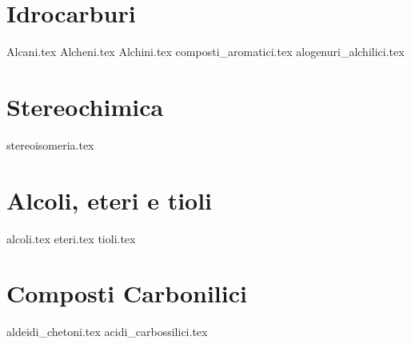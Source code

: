 \documentclass[a4paper,12pt,oneside]{book} %
\begin{document}
\part{Idrocarburi}
{Alcani.tex} %
{Alcheni.tex} %
{Alchini.tex} %
{composti_aromatici.tex} %
{alogenuri_alchilici.tex} %


\part{Stereochimica}
{stereoisomeria.tex} %


\part{Alcoli, eteri e tioli}
{alcoli.tex} %
{eteri.tex} %
{tioli.tex} %
% 

\part{Composti Carbonilici}
{aldeidi_chetoni.tex} %
{acidi_carbossilici.tex} %
\end{document}
